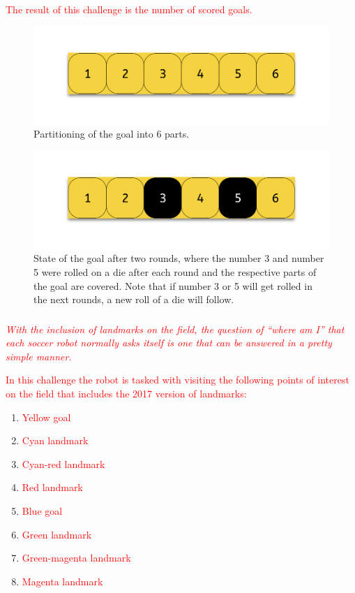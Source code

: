 \documentclass{article}
\begin{document}
\textcolor{red}{The result of this challenge is the number of scored goals.}

\begin{figure}
  \centering
  \includegraphics[width=.9\linewidth]{media/goal_parts}
  \caption{Partitioning of the goal into 6 parts.}
  \label{fig:goal_parts}
\end{figure}%
\begin{figure}
  \centering
  \includegraphics[width=.9\linewidth]{media/goal_parts_filled}
  \caption{State of the goal after two rounds, where the number 3 and number 5
      were rolled on a die after each round and the respective parts of the
      goal are covered. Note that if number 3 or 5 will get rolled in the next
      rounds, a new roll of a die will follow.}
  \label{fig:goal_parts_filled}
\end{figure}

\subsubsection{}

\textcolor{red}{\textit{With the inclusion of landmarks on the field, the
question of “where am I” that each soccer robot normally asks itself is
one that can be answered in a pretty simple manner.}}

\textcolor{red}{In this challenge the robot is tasked with visiting the
    following points of interest on the field that includes the 2017 version of
    landmarks:}

\begin{enumerate}
    \item \textcolor{red}{Yellow goal}
    \item \textcolor{red}{Cyan landmark}
    \item \textcolor{red}{Cyan-red landmark}
    \item \textcolor{red}{Red landmark}
    \item \textcolor{red}{Blue goal}
    \item \textcolor{red}{Green landmark}
    \item \textcolor{red}{Green-magenta landmark}
    \item \textcolor{red}{Magenta landmark}
\end{enumerate}
\end{document}
